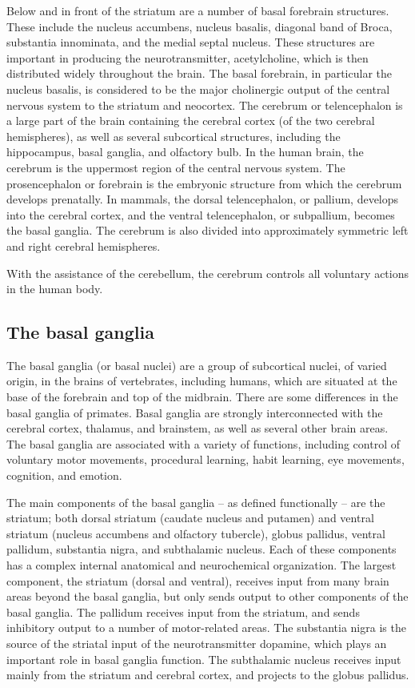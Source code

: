\documentclass[]{book}
\begin{document}
Below and in front of the striatum are a number of basal forebrain structures. These include the nucleus accumbens, nucleus basalis, diagonal band of Broca, substantia innominata, and the medial septal nucleus. These structures are important in producing the neurotransmitter, acetylcholine, which is then distributed widely throughout the brain. The basal forebrain, in particular the nucleus basalis, is considered to be the major cholinergic output of the central nervous system to the striatum and neocortex.
The cerebrum or telencephalon is a large part of the brain containing the cerebral cortex (of the two cerebral hemispheres), as well as several subcortical structures, including the hippocampus, basal ganglia, and olfactory bulb. In the human brain, the cerebrum is the uppermost region of the central nervous system. The prosencephalon or forebrain is the embryonic structure from which the cerebrum develops prenatally. In mammals, the dorsal telencephalon, or pallium, develops into the cerebral cortex, and the ventral telencephalon, or subpallium, becomes the basal ganglia. The cerebrum is also divided into approximately symmetric left and right cerebral hemispheres.

With the assistance of the cerebellum, the cerebrum controls all voluntary actions in the human body.

\hypertarget{the-basal-ganglia}{%
\subsection{The basal ganglia}\label{the-basal-ganglia}}

The basal ganglia (or basal nuclei) are a group of subcortical nuclei, of varied origin, in the brains of vertebrates, including humans, which are situated at the base of the forebrain and top of the midbrain. There are some differences in the basal ganglia of primates. Basal ganglia are strongly interconnected with the cerebral cortex, thalamus, and brainstem, as well as several other brain areas. The basal ganglia are associated with a variety of functions, including control of voluntary motor movements, procedural learning, habit learning, eye movements, cognition, and emotion.

The main components of the basal ganglia -- as defined functionally -- are the striatum; both dorsal striatum (caudate nucleus and putamen) and ventral striatum (nucleus accumbens and olfactory tubercle), globus pallidus, ventral pallidum, substantia nigra, and subthalamic nucleus. Each of these components has a complex internal anatomical and neurochemical organization. The largest component, the striatum (dorsal and ventral), receives input from many brain areas beyond the basal ganglia, but only sends output to other components of the basal ganglia. The pallidum receives input from the striatum, and sends inhibitory output to a number of motor-related areas. The substantia nigra is the source of the striatal input of the neurotransmitter dopamine, which plays an important role in basal ganglia function. The subthalamic nucleus receives input mainly from the striatum and cerebral cortex, and projects to the globus pallidus.
\end{document}
